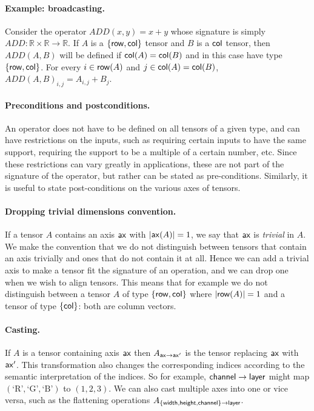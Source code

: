 \documentclass{article}
\begin{document}
\paragraph{Example: broadcasting.} Consider the operator $ADD(x,y)=x+y$ whose signature is simply $ADD:\mathbb{R} \times \mathbb{R} \rightarrow \mathbb{R}$.
If $A$ is a $\{ \mathsf{row} , \mathsf{col} \}$ tensor and $B$ is a $\mathsf{col}$ tensor, then $ADD(A,B)$ will be defined if $\mathsf{col}(A)=\mathsf{col}(B)$ and in this case  have type $\{ \mathsf{row}, \mathsf{col} \}$. For every $i \in \mathsf{row}(A)$ and $j\in \mathsf{col}(A)=\mathsf{col}(B)$, $ADD(A,B)_{i,j} = A_{i,j}+B_j$.



\paragraph{Preconditions and postconditions.} An operator does not have to be defined on all tensors of a given type, and can have restrictions on the inputs, such as requiring certain inputs to have the same support, requiring the support to be a multiple of a certain number, etc. Since these restrictions can vary greatly in applications, these are not part of the signature of the operator, but rather can be stated as pre-conditions. Similarly, it is useful to state post-conditions on the various axes of tensors. 


\paragraph{Dropping trivial dimensions convention.} If a tensor $A$  contains an axis $\mathsf{ax}$ with $|\mathsf{ax}(A)|=1$, we say that $\mathsf{ax}$ is \emph{trivial} in $A$.
We make the convention that we do not distinguish between tensors that contain an axis trivially and ones that do not contain it at all.
Hence we can add a trivial axis to make a tensor fit the signature of an operation, and we can drop one when we wish to align tensors.
This means that for example we do not distinguish between a tensor $A$ of type $\{ \mathsf{row} , \mathsf{col} \}$ where $|\mathsf{row}(A)|=1$ and a tensor of type $\{ \mathsf{col} \}$: both are column vectors.


\paragraph{Casting.} If $A$ is a tensor containing axis $\mathsf{ax}$ then $A_{\mathsf{ax} \rightarrow \mathsf{ax}'}$ is the tensor replacing $\mathsf{ax}$ with $\mathsf{ax'}$. 
This transformation  also changes the corresponding indices according to the semantic interpretation of the indices. 
So for example, $\mathsf{channel} \rightarrow \mathsf{layer}$ might map $( \text{`R'}, \text{`G'}, \text{`B'} )$ to $(1,2,3)$.
We can also cast multiple axes into one or vice versa, such as the flattening operations $A_{ \{ \mathsf{width},\mathsf{height},\mathsf{channel} \} \rightarrow \mathsf{layer} }$.
\end{document}
